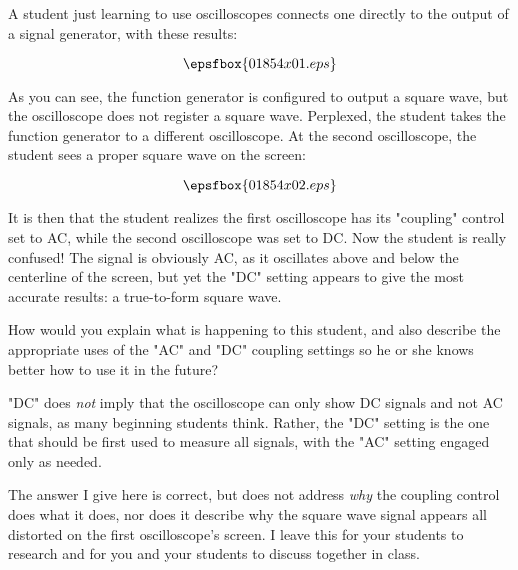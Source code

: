 

A student just learning to use oscilloscopes connects one directly to the output of a signal generator, with these results:

$$\epsfbox{01854x01.eps}$$

As you can see, the function generator is configured to output a square wave, but the oscilloscope does not register a square wave.  Perplexed, the student takes the function generator to a different oscilloscope.  At the second oscilloscope, the student sees a proper square wave on the screen:

$$\epsfbox{01854x02.eps}$$

It is then that the student realizes the first oscilloscope has its "coupling" control set to AC, while the second oscilloscope was set to DC.  Now the student is really confused!  The signal is obviously AC, as it oscillates above and below the centerline of the screen, but yet the "DC" setting appears to give the most accurate results: a true-to-form square wave.

How would you explain what is happening to this student, and also describe the appropriate uses of the "AC" and "DC" coupling settings so he or she knows better how to use it in the future?







"DC" does {\it not} imply that the oscilloscope can only show DC signals and not AC signals, as many beginning students think.  Rather, the "DC" setting is the one that should be first used to measure all signals, with the "AC" setting engaged only as needed.







The answer I give here is correct, but does not address {\it why} the coupling control does what it does, nor does it describe why the square wave signal appears all distorted on the first oscilloscope's screen.  I leave this for your students to research and for you and your students to discuss together in class.




